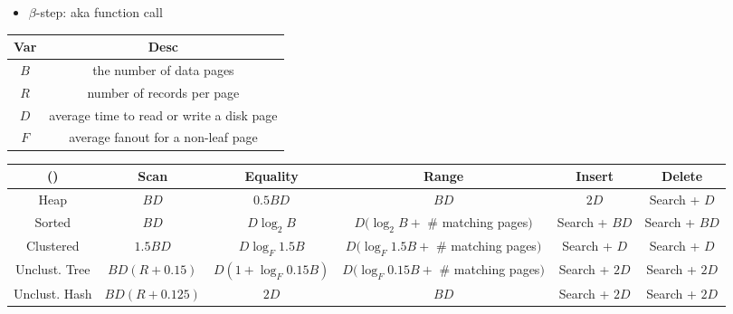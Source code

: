 \documentclass[landscape,8pt]{extarticle}
\begin{document}
\begin{multicols}{4}
\begin{itemize}
\begin{itemize}
            \item $\beta$-step: aka function call
        \end{itemize}
    \end{itemize}
    \begin{center}
        \begin{tabular}{ | c | c | } \toprule
            Var     & Desc                                      \\ \midrule
            $B$     & the number of data pages                  \\ \midrule
            $R$     & number of records per page                \\ \midrule
            $D$     & average time to read or write a disk page \\ \midrule
            $F$     & average fanout for a non-leaf page        \\ \bottomrule
        \end{tabular}
    \end{center}
    \begin{center}
        \begin{adjustbox}{angle=270}
            \begin{tabular}{ | c | c | c | c | c | c | } \toprule
                ()            & Scan          & Equality              & Range                                    & Insert        & Delete        \\ \midrule
                Heap          & $BD$          & $0.5 BD$              & $BD$                                     & $2D$          & Search + $D$  \\ \midrule
                Sorted        & $BD$          & $D \log_2 B$          & $D(\log_2 B +$ \# matching pages$)$      & Search + $BD$ & Search + $BD$ \\ \midrule
                Clustered     & $1.5 BD$      & $D \log_F 1.5 B$      & $D(\log_F 1.5B + $ \# matching pages$)$  & Search + $D$  & Search + $D$  \\ \midrule
                Unclust. Tree & $BD(R+0.15)$  & $D(1 + \log_F 0.15B)$ & $D(\log_F 0.15B + $ \# matching pages$)$ & Search + $2D$ & Search + $2D$ \\ \midrule
                Unclust. Hash & $BD(R+0.125)$ & $2D$                  & $BD$                                     & Search + $2D$ & Search + $2D$ \\ \bottomrule
            \end{tabular}
        \end{adjustbox}
    \end{center}
\end{multicols}
\end{document}
